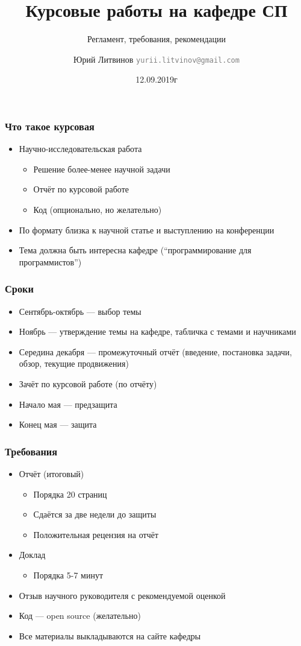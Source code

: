 \documentclass[xetex,mathserif,serif]{beamer}
\title{Курсовые работы на кафедре СП}
\subtitle{Регламент, требования, рекомендации}
\author[Юрий Литвинов]{Юрий Литвинов \newline \textcolor{gray}{\small\texttt{yurii.litvinov@gmail.com}}}
\date{12.09.2019г}
\begin{document}
	
	\frame{\titlepage}

	\begin{frame}
		\frametitle{Что такое курсовая}
		\begin{itemize}
			\item Научно-исследовательская работа
			\begin{itemize}
				\item Решение более-менее научной задачи
				\item Отчёт по курсовой работе
				\item Код (опционально, но желательно)
			\end{itemize}
			\item По формату близка к научной статье и выступлению на конференции
			\item Тема должна быть интересна кафедре (``программирование для программистов'')
		\end{itemize}
	\end{frame}

	\begin{frame}
		\frametitle{Сроки}
		\begin{itemize}
			\item Сентябрь-октябрь --- выбор темы
			\item Ноябрь --- утверждение темы на кафедре, табличка с темами и научниками
			\item Середина декабря --- промежуточный отчёт (введение, постановка задачи, обзор, текущие продвижения)
			\item Зачёт по курсовой работе (по отчёту)
			\item Начало мая --- предзащита
			\item Конец мая --- защита
		\end{itemize}
	\end{frame}

	\begin{frame}
		\frametitle{Требования}
		\begin{itemize}
			\item Отчёт (итоговый)
			\begin{itemize}
				\item Порядка 20 страниц
				\item Сдаётся за две недели до защиты
				\item Положительная рецензия на отчёт
			\end{itemize}
			\item Доклад
			\begin{itemize}
				\item Порядка 5-7 минут
			\end{itemize}
			\item Отзыв научного руководителя с рекомендуемой оценкой
			\item Код --- open source (желательно)
			\item Все материалы выкладываются на сайте кафедры
		\end{itemize}
	\end{frame}
\end{document}
